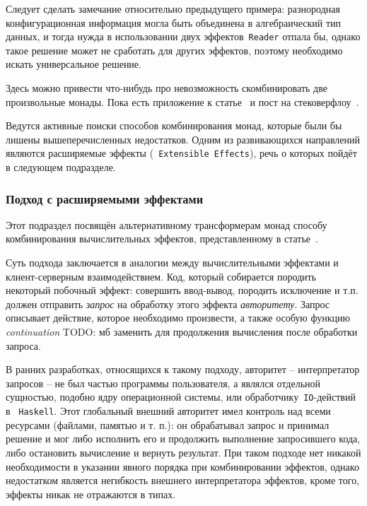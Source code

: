 Следует сделать замечание относительно предыдущего примера: разнородная конфигурационная информация могла быть объединена в алгебраический тип данных, и тогда нужда в использовании двух эффектов~\lstinline{Reader} отпала бы, однако такое решение может не сработать для других эффектов, поэтому необходимо искать универсальное решение. 

Здесь можно привести что-нибудь про невозможность скомбинировать две произвольные монады. Пока есть приложение к статье~\autocite{ComposingMonads} и пост на стековерфлоу~\autocite{SOMonadsComposition}.

Ведутся активные поиски способов комбинирования монад, которые были бы лишены вышеперечисленных недостатков. Одним из развивающихся направлений являются расширяемые эффекты (~\lstinline{Extensible Effects}), речь о которых пойдёт в следующем подразделе.

\subsubsection{Подход с расширяемыми эффектами}

Этот подраздел посвящён альтернативному трансформерам монад способу комбинирования вычислительных эффектов, представленному в статье~\autocite{ExtEffects}. 

Суть подхода заключается в аналогии между вычислительными эффектами и клиент-серверным взаимодействием. Код, который собирается породить некоторый побочный эффект: совершить ввод-вывод, породить исключение и т.п. должен отправить \emph{запрос} на обработку этого эффекта \emph{авторитету}. Запрос описывает действие, которое необходимо произвести, а также особую функцию \emph{continuation} TODO: мб заменить для продолжения вычисления после обработки запроса. 

В ранних разработках, относящихся к такому подходу, авторитет -- интерпретатор запросов -- не был частью программы пользователя, а являлся отдельной сущностью, подобно ядру операционной системы, или обработчику~\lstinline{IO}-действий в ~\lstinline{Haskell}. Этот глобальный внешний авторитет имел контроль над всеми ресурсами (файлами, памятью и т. п.): он обрабатывал запрос и принимал решение и мог либо исполнить его и продолжить выполнение запросившего кода, либо остановить вычисление и вернуть результат. При таком подходе нет никакой необходимости в указании явного порядка при комбинировании эффектов, однако недостатком является негибкость внешнего интерпретатора эффектов, кроме того, эффекты никак не отражаются в типах.


